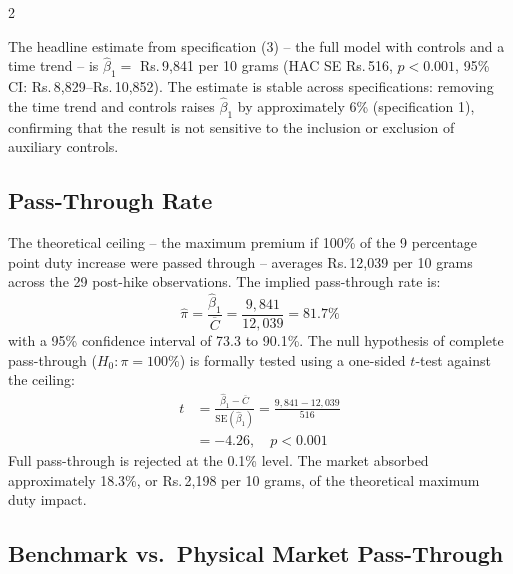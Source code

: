 \documentclass[12pt]{article}
\begin{document}
\begin{multicols}{2}

The headline estimate from specification (3) -- the full model with controls and a time trend -- is $\hat{\beta}_1 = $ Rs.\,9,841 per 10 grams (HAC SE Rs.\,516, $p < 0.001$, 95\% CI: Rs.\,8,829--Rs.\,10,852). The estimate is stable across specifications: removing the time trend and controls raises $\hat{\beta}_1$ by approximately 6\% (specification 1), confirming that the result is not sensitive to the inclusion or exclusion of auxiliary controls.

\subsection*{Pass-Through Rate}

The theoretical ceiling -- the maximum premium if 100\% of the 9 percentage point duty increase were passed through -- averages Rs.\,12,039 per 10 grams across the 29 post-hike observations. The implied pass-through rate is:
\begin{equation}
\hat{\pi} = \frac{\hat{\beta}_1}{\overline{C}} = \frac{9{,}841}{12{,}039} = 81.7\%
\end{equation}
with a 95\% confidence interval of 73.3 to 90.1\%. The null hypothesis of complete pass-through ($H_0: \pi = 100\%$) is formally tested using a one-sided $t$-test against the ceiling:
\begin{equation}
\begin{split}
t &= \frac{\hat{\beta}_1 - \overline{C}}{\text{SE}(\hat{\beta}_1)}
   = \frac{9{,}841 - 12{,}039}{516} \\
  &= -4.26, \quad p < 0.001
\end{split}
\end{equation}
Full pass-through is rejected at the 0.1\% level. The market absorbed approximately 18.3\%, or Rs.\,2,198 per 10 grams, of the theoretical maximum duty impact.

\subsection*{Benchmark vs.\ Physical Market Pass-Through}


\end{multicols}
\end{document}
